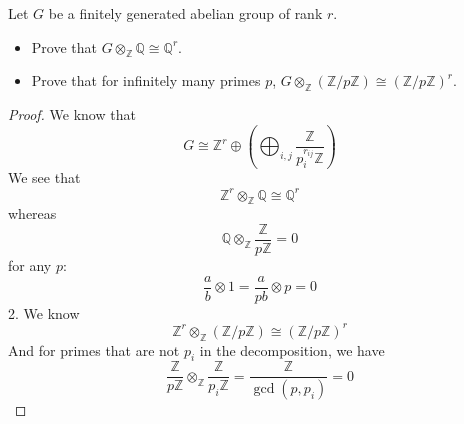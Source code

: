 \documentclass[openany]{book}
\newcommand{\Z}{\mathbb{Z}}
\newcommand{\Q}{\mathbb{Q}}
\begin{document}
    
    \begin{prob}[2.9]
    Let \( G \) be a finitely generated abelian group of rank \( r \).
    
    \begin{itemize}
        \item Prove that \( G \otimes_{\mathbb{Z}} \mathbb{Q} \cong \mathbb{Q}^r \).
        \item Prove that for infinitely many primes \( p \), \( G \otimes_{\mathbb{Z}} (\mathbb{Z}/p\mathbb{Z}) \cong (\mathbb{Z}/p\mathbb{Z})^r \).
    \end{itemize}
    \end{prob}
\begin{proof}
    We know that 
    \begin{equation*}
        G\cong\Z^r\oplus\left(\bigoplus_{i,j}\frac{\Z}{p_i^{r_{ij}}\Z}\right)
    \end{equation*}
    We see that 
    \begin{equation*}
        \Z^r\otimes_\Z\Q\cong\Q^r
    \end{equation*}
    whereas 
    \begin{equation*}
        \Q\otimes_\Z\frac{\Z}{p\Z}=0
    \end{equation*}
    for any $p$:
    \begin{equation*}
        \frac{a}{b}\otimes 1=\frac{a}{pb}\otimes p=0
    \end{equation*}
    2. We know 
    \begin{equation*}
        \Z^r\otimes_\Z(\Z/p\Z)\cong(\Z/p\Z)^r
    \end{equation*}
    And for primes that are not $p_i$ in the decomposition, we have 
    \begin{equation*}
        \frac{\Z}{p\Z}\otimes_\Z\frac{\Z}{p_i\Z}=\frac{\Z}{\gcd(p,p_i)}=0
    \end{equation*}
\end{proof}
\end{document}
